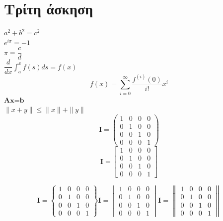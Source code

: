 \documentclass[a4paper,11pt]{article}
\newcommand{\lt}{\latintext}
\newcommand{\gt}{\greektext}
\begin{document}
\section{Τρίτη άσκηση}\lt
\begin{center}
$a^2+b^2=c^2$\\
$e^{i\pi}=-1$\\
$\pi = \dfrac{c}{d}$\\
$\dfrac{d}{dx} \int_{a}^{x}f(s)ds=f(x)$\\
\[f(x)=\sum_{i=0}^{\infty}\dfrac{f^{(i)}(0)}{i!}x^i\]
$\textbf{Ax=b}$\\
$\|x+y\| \leq \|x\|+\|y\| $\\

\begin{equation}
\textbf{I}=\begin{pmatrix}    
    1 & 0 & 0 & 0 \\ 
    0 & 1 & 0 & 0 \\
    0 & 0 & 1 & 0 \\
    0 & 0 & 0 & 1
\end{pmatrix}
\end{equation}
\begin{equation}
\textbf{I}=\begin{bmatrix}    
    1 & 0 & 0 & 0 \\ 
    0 & 1 & 0 & 0 \\
    0 & 0 & 1 & 0 \\
    0 & 0 & 0 & 1
\end{bmatrix}
\end{equation}

\begin{equation}
\textbf{I}=\begin{Bmatrix}    
    1 & 0 & 0 & 0 \\ 
    0 & 1 & 0 & 0 \\
    0 & 0 & 1 & 0 \\
    0 & 0 & 0 & 1
\end{Bmatrix}
\textbf{I}=\begin{vmatrix}    
    1 & 0 & 0 & 0 \\ 
    0 & 1 & 0 & 0 \\
    0 & 0 & 1 & 0 \\
    0 & 0 & 0 & 1
\end{vmatrix}
\textbf{I}=\begin{Vmatrix}    
    1 & 0 & 0 & 0 \\ 
    0 & 1 & 0 & 0 \\
    0 & 0 & 1 & 0 \\
    0 & 0 & 0 & 1
\end{Vmatrix}
\end{equation}

\end{center}\gt
\end{document}
